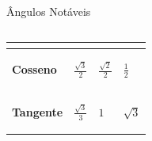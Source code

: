 \documentclass[aspectratio=169, t, 8pt]{beamer}
\begin{document}
\begin{frame} {Ângulos Notáveis}
\begin{columns}[totalwidth=.9\textwidth]
\begin{column}{\textwidth}
\begin{tabular}{m{} | m{} | m{} | m{}}
{                        }\\[1.8em]
                    
                    \hline

                    \begin{center}
                        \textbf{Cosseno}    
                    \end{center}
                    &
                    \begin{center}
                        $\displaystyle \frac{\sqrt{3}}{2}$     
                    \end{center}
                    &
                    \begin{center}
                        $\displaystyle\frac{\sqrt{2}}{2}$
                    \end{center} 
                    & {
                        \begin{center}
                            $\displaystyle \frac{1}{2}$
                        \end{center}
                    }\\[1.8em]

                    \hline

                    \begin{center}
                        \textbf{Tangente}
                    \end{center}
                    &
                    \begin{center}
                        $\displaystyle \frac{\sqrt{3}}{3}$
                    \end{center}
                    &
                    \begin{center}
                        $1$
                    \end{center}
                    &
                    {
                        \begin{center}
                            $\displaystyle {\sqrt{3}}$
                        \end{center}
                    }\\[1.8em]


\end{tabular}
\end{column}
\end{columns}
\end{frame}
\end{document}
